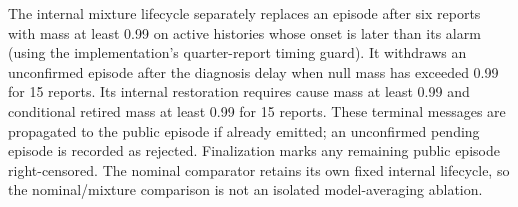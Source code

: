 The internal mixture lifecycle separately replaces an episode after six
reports with mass at least 0.99 on active histories whose onset is later
than its alarm (using the implementation's quarter-report timing guard).
It withdraws an unconfirmed episode after the diagnosis delay when null
mass has exceeded 0.99 for 15 reports. Its internal restoration requires
cause mass at least 0.99 and conditional retired mass at least 0.99 for
15 reports. These terminal messages are propagated to the public episode
if already emitted; an unconfirmed pending episode is recorded as
rejected. Finalization marks any remaining public episode right-censored.
The nominal comparator retains its own fixed internal lifecycle, so the
nominal/mixture comparison is not an isolated model-averaging ablation.
